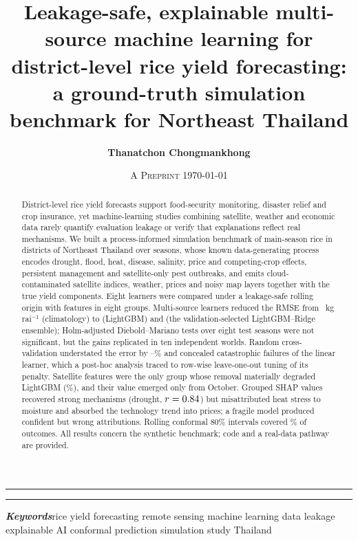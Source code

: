 \documentclass[10pt]{article}
\title{Leakage-safe, explainable multi-source machine learning for district-level rice yield forecasting: a ground-truth simulation benchmark for Northeast Thailand}
\author{\textbf{Thanatchon Chongmankhong}}
\date{\textsc{A Preprint} \quad\textperiodcentered\quad \today}
\makeatletter
\newcommand{\kgrai}{kg\,rai$^{-1}$}
\renewcommand{\maketitle}{\begingroup\centering
  \vspace*{-6pt}\rule{\linewidth}{1.4pt}\par\vspace{10pt}
  {\LARGE\bfseries\@title\par}\vspace{8pt}
  \rule{\linewidth}{0.5pt}\par\vspace{16pt}
  {\large\@author\par}\vspace{10pt}
  {\small\@date\par}\vspace{16pt}
  \endgroup\thispagestyle{plain}}
\makeatother
\begin{document}
\maketitle
\begin{abstract}
\noindent District-level rice yield forecasts support food-security monitoring, disaster relief and crop insurance, yet machine-learning studies combining satellite, weather and economic data rarely quantify evaluation leakage or verify that explanations reflect real mechanisms. We built a process-informed simulation benchmark of main-season rice in \nDistricts{} districts of Northeast Thailand over \nSeasons{} seasons, whose known data-generating process encodes drought, flood, heat, disease, salinity, price and competing-crop effects, persistent management and satellite-only pest outbreaks, and emits cloud-contaminated satellite indices, weather, prices and noisy map layers together with the true yield components. Eight learners were compared under a leakage-safe rolling origin with \nFeatures{} features in eight groups. Multi-source learners reduced the RMSE from \rmseClim{}~\kgrai{} (climatology) to \rmseLGB{} (LightGBM) and \rmseMain{} (the validation-selected LightGBM--Ridge ensemble); Holm-adjusted Diebold--Mariano tests over eight test seasons were not significant, but the gains replicated in ten independent worlds. Random cross-validation understated the error by \gainRandomLGB--\gainRandom\% and concealed catastrophic failures of the linear learner, which a post-hoc analysis traced to row-wise leave-one-out tuning of its penalty. Satellite features were the only group whose removal materially degraded LightGBM (\ablLGBSatellite\%), and their value emerged only from October. Grouped SHAP values recovered strong mechanisms (drought, $r=0.84$) but misattributed heat stress to moisture and absorbed the technology trend into prices; a fragile model produced confident but wrong attributions. Rolling conformal 80\% intervals covered \covEighty\% of outcomes. All results concern the synthetic benchmark; code and a real-data pathway are provided.
\end{abstract}
\noindent\textbf{\textit{Keywords}}\enspace rice yield forecasting \textperiodcentered{} remote sensing \textperiodcentered{} machine learning \textperiodcentered{} data leakage \textperiodcentered{} explainable AI \textperiodcentered{} conformal prediction \textperiodcentered{} simulation study \textperiodcentered{} Thailand






\end{document}
